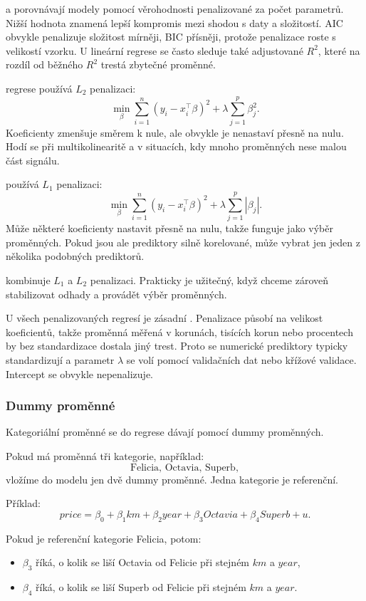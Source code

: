  a  porovnávají modely pomocí věrohodnosti penalizované za počet parametrů.
Nižší hodnota znamená lepší kompromis mezi shodou s daty a složitostí. AIC obvykle penalizuje
složitost mírněji, BIC přísněji, protože penalizace roste s velikostí vzorku. U lineární regrese se
často sleduje také adjustované \(R^2\), které na rozdíl od běžného \(R^2\) trestá zbytečné proměnné.

 regrese používá \(L_2\) penalizaci:
\[
  \min_\beta \sum_{i=1}^n (y_i-x_i^\top\beta)^2 + \lambda \sum_{j=1}^p \beta_j^2.
\]
Koeficienty zmenšuje směrem k nule, ale obvykle je nenastaví přesně na nulu. Hodí se při multikolinearitě
a v situacích, kdy mnoho proměnných nese malou část signálu.

 používá \(L_1\) penalizaci:
\[
  \min_\beta \sum_{i=1}^n (y_i-x_i^\top\beta)^2 + \lambda \sum_{j=1}^p |\beta_j|.
\]
Může některé koeficienty nastavit přesně na nulu, takže funguje jako výběr proměnných. Pokud jsou ale
prediktory silně korelované, může vybrat jen jeden z několika podobných prediktorů.

 kombinuje \(L_1\) a \(L_2\) penalizaci. Prakticky je užitečný, když chceme zároveň
stabilizovat odhady a provádět výběr proměnných.

U všech penalizovaných regresí je zásadní . Penalizace působí na velikost
koeficientů, takže proměnná měřená v korunách, tisících korun nebo procentech by bez standardizace
dostala jiný trest. Proto se numerické prediktory typicky standardizují a parametr \(\lambda\) se volí
pomocí validačních dat nebo křížové validace. Intercept se obvykle nepenalizuje.

\subsubsection{Dummy proměnné}

Kategoriální proměnné se do regrese dávají pomocí dummy proměnných.

Pokud má proměnná tři kategorie, například:
\[
\text{Felicia, Octavia, Superb},
\]
vložíme do modelu jen dvě dummy proměnné. Jedna kategorie je referenční.

Příklad:
\[
price = \beta_0+\beta_1 km+\beta_2 year+\beta_3 Octavia+\beta_4 Superb+u.
\]

Pokud je referenční kategorie Felicia, potom:
\begin{itemize}
    \item $\beta_3$ říká, o kolik se liší Octavia od Felicie při stejném $km$ a $year$,
    \item $\beta_4$ říká, o kolik se liší Superb od Felicie při stejném $km$ a $year$.
\end{itemize}

